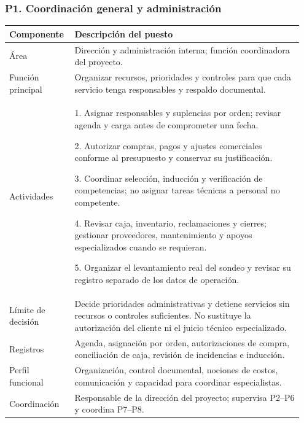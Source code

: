 {\par\medskip\noindent\begin{minipage}{\linewidth}\subsubsection*{P1. Coordinación general y administración}
{\small\renewcommand{\arraystretch}{1.15}\begin{tabular}{@{}p{0.20\linewidth}p{0.75\linewidth}@{}}\toprule
\textbf{Componente} & \textbf{Descripción del puesto} \\ \midrule
Área & Dirección y administración interna; función coordinadora del proyecto. \\ \midrule
Función principal & Organizar recursos, prioridades y controles para que cada servicio tenga responsables y respaldo documental. \\ \midrule
Actividades & 1. Asignar responsables y suplencias por orden; revisar agenda y carga antes de comprometer una fecha.\par 2. Autorizar compras, pagos y ajustes comerciales conforme al presupuesto y conservar su justificación.\par 3. Coordinar selección, inducción y verificación de competencias; no asignar tareas técnicas a personal no competente.\par 4. Revisar caja, inventario, reclamaciones y cierres; gestionar proveedores, mantenimiento y apoyos especializados cuando se requieran.\par 5. Organizar el levantamiento real del sondeo y revisar su registro separado de los datos de operación. \\ \midrule
Límite de decisión & Decide prioridades administrativas y detiene servicios sin recursos o controles suficientes. No sustituye la autorización del cliente ni el juicio técnico especializado. \\ \midrule
Registros & Agenda, asignación por orden, autorizaciones de compra, conciliación de caja, revisión de incidencias e inducción. \\ \midrule
Perfil funcional & Organización, control documental, nociones de costos, comunicación y capacidad para coordinar especialistas. \\ \midrule
Coordinación & Responsable de la dirección del proyecto; supervisa P2–P6 y coordina P7–P8. \\ \midrule
\end{tabular}}\end{minipage}\par\medskip
}
